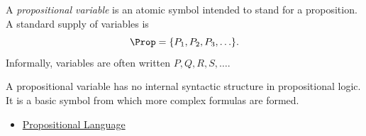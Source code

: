 \begin{tcolorbox}[colback=propbox, colframe=propborder, arc=2pt,
  left=6pt, right=6pt, top=4pt, bottom=4pt,
  title={\small\textbf{Definition (Propositional Variable)}},
  fonttitle=\small\bfseries]
\label{def:propositional-variable}
A \emph{propositional variable} is an atomic symbol intended to stand for a
proposition. A standard supply of variables is
\[
\Prop = \{P_1,P_2,P_3,\ldots\}.
\]
Informally, variables are often written $P,Q,R,S,\ldots$.
\end{tcolorbox}

\begin{remark*}[Interpretation]
A propositional variable has no internal syntactic structure in propositional
logic. It is a basic symbol from which more complex formulas are formed.
\end{remark*}

\begin{dependencies}
\begin{itemize}
  \item \hyperref[def:propositional-language]{Propositional Language}
\end{itemize}
\end{dependencies}

